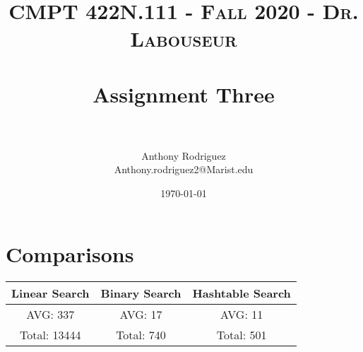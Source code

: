 \documentclass[letterpaper, 10pt,DIV=13]{scrartcl}
\title{	
   \normalfont \normalsize 
   \textsc{CMPT 422N.111 - Fall 2020 - Dr. Labouseur} \\[10pt] %
   \horrule{0.5pt} \\[0.25cm] 	%
   \huge Assignment Three  \\     	    %
   \horrule{0.5pt} \\[0.25cm] 	%
}
\author{Anthony Rodriguez \\ \normalsize Anthony.rodriguez2@Marist.edu}
\date{\normalsize\today} 	%
\numberwithin{equation}{section} %
\numberwithin{figure}{section} %
\numberwithin{table}{section} %
\begin{document}
\maketitle %

\section{Comparisons}
\bigskip
\begin{center}
 \begin{tabular}{||c c c ||} 
 \hline
 Linear Search & Binary Search & Hashtable Search \\ [0.5ex] 
 \hline\hline
 AVG: 337 & AVG: 17 & AVG: 11 \\ 
\hline\hline
 Total: 13444 & Total: 740 & Total: 501 \\
\hline
\end{tabular}
\end{center}
\end{document}
